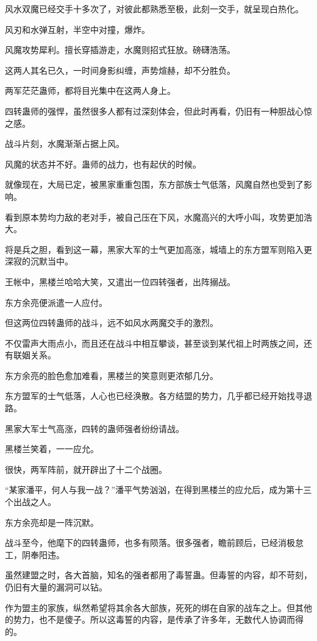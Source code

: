 \begin{this_body}
风水双魔已经交手十多次了，对彼此都熟悉至极，此刻一交手，就呈现白热化。

风刃和水弹互射，半空中对撞，爆炸。

风魔攻势犀利。擅长穿插游走，水魔则招式狂放。磅礴浩荡。

这两人其名已久，一时间身影纠缠，声势煊赫，却不分胜负。

两军茫茫蛊师，都将目光集中在这两人身上。

四转蛊师的强悍，虽然很多人都有过深刻体会，但此时再看，仍旧有一种胆战心惊之感。

战斗片刻，水魔渐渐占据上风。

风魔的状态并不好。蛊师的战力，也有起伏的时候。

就像现在，大局已定，被黑家重重包围，东方部族士气低落，风魔自然也受到了影响。

看到原本势均力敌的老对手，被自己压在下风，水魔高兴的大呼小叫，攻势更加浩大。

将是兵之胆，看到这一幕，黑家大军的士气更加高涨，城墙上的东方盟军则陷入更深寂的沉默当中。

王帐中，黑楼兰哈哈大笑，又遣出一位四转强者，出阵搦战。

东方余亮便派遣一人应付。

但这两位四转蛊师的战斗，远不如风水两魔交手的激烈。

不仅雷声大雨点小，而且还在战斗中相互攀谈，甚至谈到某代祖上时两族之间，还有联姻关系。

东方余亮的脸色愈加难看，黑楼兰的笑意则更浓郁几分。

东方盟军的士气低落，人心也已经涣散。各方结盟的势力，几乎都已经开始找寻退路。

黑家大军士气高涨，四转的蛊师强者纷纷请战。

黑楼兰笑着，一一应允。

很快，两军阵前，就开辟出了十二个战圈。

“某家潘平，何人与我一战？”潘平气势汹汹，在得到黑楼兰的应允后，成为第十三个出战之人。

东方余亮却是一阵沉默。

战斗至今，他麾下的四转蛊师，也多有陨落。很多强者，瞻前顾后，已经消极怠工，阴奉阳违。

虽然建盟之时，各大首脑，知名的强者都用了毒誓蛊。但毒誓的内容，却不苛刻，仍旧有大量的漏洞可以钻。

作为盟主的家族，纵然希望将其余各大部族，死死的绑在自家的战车之上。但其他的势力，也不是傻子。所以这毒誓的内容，是传承了许多年，无数代人协调而得的。


\end{this_body}
